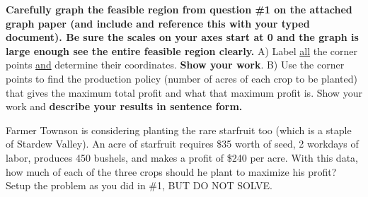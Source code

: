 \documentclass[11pt,epsfig]{article}
\begin{document}
\begin{problem}{25}
\textbf{Carefully graph the feasible region from question \#1 on the attached graph paper (and include and reference this with your typed document). Be sure the scales on your axes start at 0 and the graph is large enough see the entire feasible region clearly.}
\newline
A)  Label \underline{all} the corner points \underline{and} determine their coordinates. \textbf{Show your work}.
\newline
B) Use the corner points to find the production policy (number of acres of each crop to be planted) that gives the maximum total profit and what that maximum profit is. Show your work and \textbf{describe your results in sentence form.}

\vfill
\end{problem}


\begin{problem}{20}
Farmer Townson is considering planting the rare starfruit too (which is a staple of Stardew Valley). An acre of starfruit requires \$35 worth of seed, 2 workdays of labor, produces 450 bushels, and makes a profit of \$240 per acre. With this data, how much of each of the three crops should he plant to maximize his profit?
\newline
Setup the problem as you did in \#1, BUT DO NOT SOLVE.

\vfill
\end{problem}






\showpoints
\end{document}

